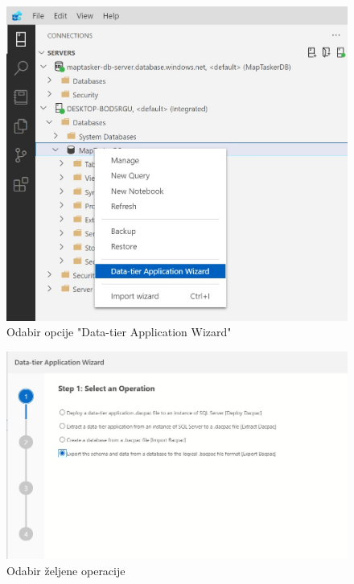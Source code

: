 		\begin{figure}[H]
			 \includegraphics[width=\linewidth]{./slike/baza3.jpg}
			  \centering
			  \caption{Odabir opcije "Data-tier Application Wizard"}
		  \end{figure}

		\vspace{25mm}

		\begin{figure}[H]
			 \includegraphics[width=\linewidth]{./slike/baza4.jpg}
			  \centering
			  \caption{Odabir željene operacije}
		  \end{figure}
		
		\vspace{15mm}


